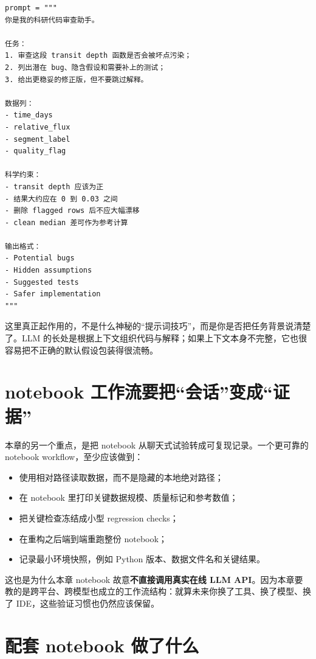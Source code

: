 \begin{examplebox}
\begin{lstlisting}[style=pythonstyle]
prompt = """
你是我的科研代码审查助手。

任务：
1. 审查这段 transit depth 函数是否会被坏点污染；
2. 列出潜在 bug、隐含假设和需要补上的测试；
3. 给出更稳妥的修正版，但不要跳过解释。

数据列：
- time_days
- relative_flux
- segment_label
- quality_flag

科学约束：
- transit depth 应该为正
- 结果大约应在 0 到 0.03 之间
- 删除 flagged rows 后不应大幅漂移
- clean median 差可作为参考计算

输出格式：
- Potential bugs
- Hidden assumptions
- Suggested tests
- Safer implementation
"""
\end{lstlisting}
\end{examplebox}

这里真正起作用的，不是什么神秘的“提示词技巧”，而是你是否把任务背景说清楚了。LLM 的长处是根据上下文组织代码与解释；如果上下文本身不完整，它也很容易把不正确的默认假设包装得很流畅。

\section{notebook 工作流要把“会话”变成“证据”}

本章的另一个重点，是把 notebook 从聊天式试验转成可复现记录。一个更可靠的 notebook workflow，至少应该做到：

\begin{itemize}
    \item 使用相对路径读取数据，而不是隐藏的本地绝对路径；
    \item 在 notebook 里打印关键数据规模、质量标记和参考数值；
    \item 把关键检查冻结成小型 regression checks；
    \item 在重构之后端到端重跑整份 notebook；
    \item 记录最小环境快照，例如 Python 版本、数据文件名和关键结果。
\end{itemize}

这也是为什么本章 notebook 故意\textbf{不直接调用真实在线 LLM API}。因为本章要教的是跨平台、跨模型也成立的工作流结构：就算未来你换了工具、换了模型、换了 IDE，这些验证习惯也仍然应该保留。

\section{配套 notebook 做了什么}

